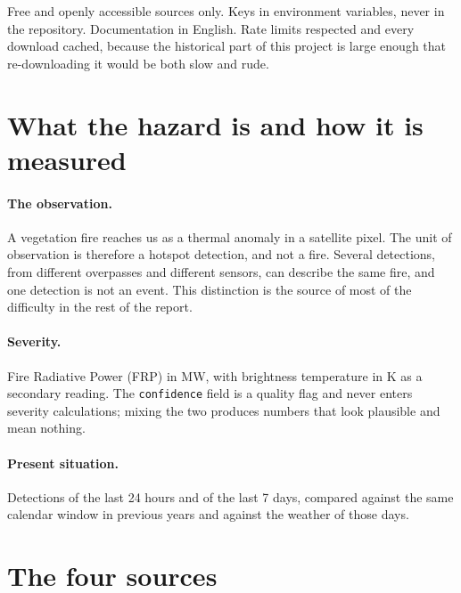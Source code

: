 \documentclass[11pt,a4paper]{article}
\begin{document}
Free and openly accessible sources only. Keys in environment variables, never in the repository.
Documentation in English. Rate limits respected and every download cached, because the historical
part of this project is large enough that re-downloading it would be both slow and rude.

\section{What the hazard is and how it is measured}

\paragraph{The observation.} A vegetation fire reaches us as a thermal anomaly in a satellite pixel.
The unit of observation is therefore a hotspot detection, and not a fire. Several detections, from
different overpasses and different sensors, can describe the same fire, and one detection is not an
event. This distinction is the source of most of the difficulty in the rest of the report.

\paragraph{Severity.} Fire Radiative Power (FRP) in MW, with brightness temperature in K as a
secondary reading. The \texttt{confidence} field is a quality flag and never enters severity
calculations; mixing the two produces numbers that look plausible and mean nothing.

\paragraph{Present situation.} Detections of the last 24 hours and of the last 7 days, compared
against the same calendar window in previous years and against the weather of those days.

\section{The four sources}
\end{document}

